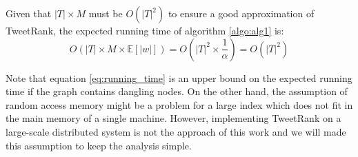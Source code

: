Given that $|T| \times M$ must be $O(|T|^ 2)$ to ensure a good approximation of TweetRank, the expected running time of algorithm \ref{algo:alg1} is:
\begin{equation}\label{eq:running_time}
O(|T| \times M \times \mathbb{E}[|w|]) = O(|T|^2 \times \frac{1}{\alpha}) = O(|T|^2)
\end{equation}

Note that equation \ref{eq:running_time} is an upper bound on the expected running time if the graph contains dangling nodes. On the other hand, the assumption of random access memory might be a problem for a large index which does not fit in the main memory of a single machine. However, implementing TweetRank on a large-scale distributed system is not the approach of this work and we will made this assumption to keep the analysis simple.